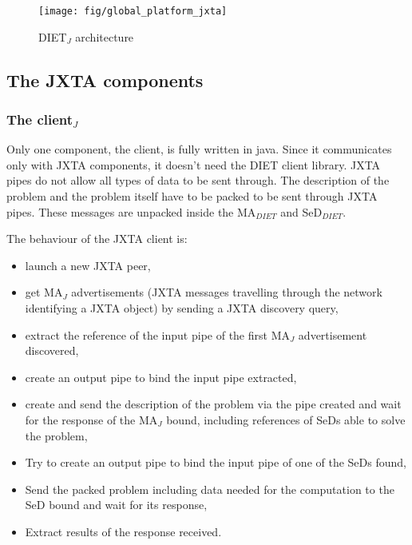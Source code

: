 \begin{figure}[htb]
 \begin{center}
   \texttt{[image: fig/global\_platform\_jxta]}
  \caption{DIET$_{J}$ architecture}
 \end{center}
\end{figure}

\subsection{The JXTA components}
\label{ssec:jxtacomponents}

\subsubsection{The client$_{J}$}
\label{sssec:jxtaclient}

Only one component, the client, is fully written in java. Since it
communicates only with JXTA components, it doesn't need the DIET
client library.  JXTA pipes do not allow all types of data to be sent
through. The description of the problem and the problem itself have to
be packed to be sent through JXTA pipes. These messages are unpacked
inside the MA$_{DIET}$ and SeD$_{DIET}$.

The behaviour of the JXTA client is:

\begin {itemize}
\item{launch a new JXTA peer,}
\item{get MA$_{J}$ advertisements (JXTA messages travelling through
    the network identifying a JXTA object) by sending a JXTA discovery
    query,}
\item{extract the reference of the input pipe of the first
    MA$_{J}$ advertisement discovered,}
\item{create an output pipe to bind the input pipe extracted,}
\item{create and send the description of the problem via the pipe
    created and wait for the response of the MA$_{J}$ bound, including
    references of SeDs able to solve the problem,}
\item{Try to create an output pipe to bind the input pipe of one of
    the SeDs found,}
\item{Send the packed problem including data needed for the
    computation to the SeD bound and wait for its response,}
\item{Extract results of the response received.}
\end{itemize}

